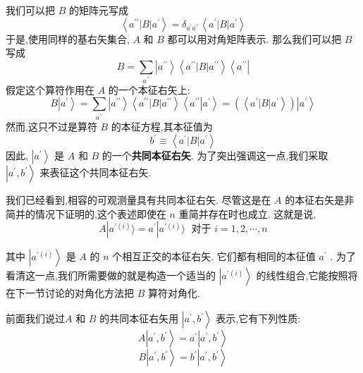 \documentclass[lang=cn,newtx,10pt,scheme=chinese,thmcnt=section]{elegantbook}
\begin{document}
我们可以把 $B$ 的矩阵元写成
\begin{equation}
	\left\langle {{a}^{\prime \prime }\left| B\right| {a}^{\prime }}\right\rangle = {\delta }_{{a}^{\prime }{a}^{\prime \prime }}\left\langle {{a}^{\prime }\left| B\right| {a}^{\prime }}\right\rangle
\end{equation}
于是,使用同样的基右矢集合, $A$ 和 $B$ 都可以用对角矩阵表示. 那么我们可以把 $B$ 写成
\begin{equation}
	B = \mathop{\sum }\limits_{{a}^{\prime \prime }}\left| {a}^{\prime \prime }\right\rangle \left\langle {{a}^{\prime \prime }\left| B\right| {a}^{\prime \prime }}\right\rangle \left\langle {a}^{\prime \prime }\right|
\end{equation}
假定这个算符作用在 $A$ 的一个本征右矢上:
\begin{equation}
	B\left| {a}^{\prime }\right\rangle = \mathop{\sum }\limits_{{a}^{\prime \prime }}\left| {a}^{\prime \prime }\right\rangle \left\langle {{a}^{\prime \prime }\left| B\right| {a}^{\prime \prime }}\right\rangle \left\langle {{a}^{\prime \prime }\left| {a}^{\prime }\right\rangle } = \left( \left\langle {{a}^{\prime }\left| B\right| {a}^{\prime }}\right\rangle \right) \left| {a}^{\prime }\right\rangle
\end{equation}
然而,这只不过是算符 $B$ 的本征方程,其本征值为
\begin{equation}
	{b}^{\prime } \equiv \left\langle {{a}^{\prime }\left| B\right| {a}^{\prime }}\right\rangle
\end{equation}
因此, $\left| {a}^{\prime }\right\rangle$ 是 $A$ 和 $B$ 的一个\textbf{共同本征右矢}. 为了突出强调这一点,我们采取 $\left| {{a}^{\prime },{b}^{\prime }}\right\rangle$ 来表征这个共同本征右矢.

我们已经看到,相容的可观测量具有共同本征右矢. 尽管这是在 $A$ 的本征右矢是非简并的情况下证明的,这个表述即使在 $n$ 重简并存在时也成立. 这就是说,
\begin{equation}
	A| {a}^{\prime \left( i\right) }\rangle = {a}^{\prime }| {a}^{\prime \left( i\right) }\rangle \;\text{ 对于 }i = 1,2,\cdots, n
\end{equation}

其中 $\left| {a}^{\prime \left( i\right) }\right\rangle$ 是 $A$ 的 $n$ 个相互正交的本征右矢. 它们都有相同的本征值 ${a}^{\prime }$ . 为了看清这一点,我们所需要做的就是构造一个适当的 $\left| {a}^{\prime \left( i\right) }\right\rangle$ 的线性组合,它能按照将在下一节讨论的对角化方法把 $B$ 算符对角化.

前面我们说过$A$ 和 $B$ 的共同本征右矢用 $\left| {{a}^{\prime },{b}^{\prime }}\right\rangle$ 表示,它有下列性质:
\begin{equation}
	A\left| {{a}^{\prime },{b}^{\prime }}\right\rangle = {a}^{\prime }\left| {{a}^{\prime },{b}^{\prime }}\right\rangle
\end{equation}
\begin{equation}
	B\left| {{a}^{\prime },{b}^{\prime }}\right\rangle = {b}^{\prime }\left| {{a}^{\prime },{b}^{\prime }}\right\rangle
\end{equation}
\end{document}
